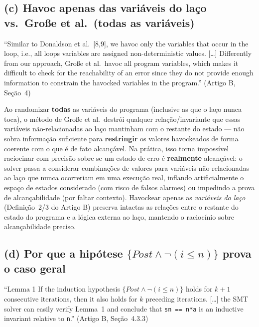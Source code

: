 \documentclass[12pt,a4paper]{article}
\begin{document}
\subsection{(c) Havoc apenas das variáveis do laço vs.\ Große et al.\ (todas as variáveis)}

\begin{tcolorbox}[quotebox]
``Similar to Donaldson et al.\ [8,9], we havoc only the variables that occur in the loop, i.e.,
all loops variables are assigned non-deterministic values. [\ldots] Differently from our
approach, Gro\ss{}e et al.\ havoc all program variables, which makes it difficult to check for
the reachability of an error since they do not provide enough information to constrain the
havocked variables in the program.'' (Artigo B, Se\c{c}\~ao~4)
\end{tcolorbox}

\begin{tcolorbox}[resultbox]
Ao randomizar \textbf{todas} as vari\'aveis do programa (inclusive as que o la\c{c}o nunca
toca), o m\'etodo de Gro\ss{}e et al.\ destr\'oi qualquer rela\c{c}\~ao/invariante que essas
vari\'aveis n\~ao-relacionadas ao la\c{c}o mantinham com o restante do estado --- n\~ao
sobra informa\c{c}\~ao suficiente para \textbf{restringir} os valores havockeados de forma
coerente com o que \'e de fato alcan\c{c}\'avel. Na pr\'atica, isso torna imposs\'ivel
raciocinar com precis\~ao sobre se um estado de erro \'e \textbf{realmente} alcan\c{c}\'avel:
o solver passa a considerar combina\c{c}\~oes de valores para vari\'aveis n\~ao-relacionadas
ao la\c{c}o que nunca ocorreriam em uma execu\c{c}\~ao real, inflando artificialmente o
espa\c{c}o de estados considerado (com risco de falsos alarmes) ou impedindo a prova de
alcan\c{c}abilidade (por faltar contexto). Havockear apenas as \emph{vari\'aveis do la\c{c}o}
(Defini\c{c}\~ao~2/3 do Artigo B) preserva intactas as rela\c{c}\~oes entre o restante do
estado do programa e a l\'ogica externa ao la\c{c}o, mantendo o racioc\'inio sobre
alcan\c{c}abilidade preciso.
\end{tcolorbox}

\subsection{(d) Por que a hipótese $\{Post \wedge \neg(i \le n)\}$ prova o caso geral}

\begin{tcolorbox}[quotebox]
``Lemma 1 If the induction hypothesis $\{Post\wedge\neg(i\le n)\}$ holds for $k+1$ consecutive
iterations, then it also holds for $k$ preceding iterations. [\ldots] the SMT solver can
easily verify Lemma~1 and conclude that \texttt{sn == n*a} is an inductive invariant relative
to \texttt{n}.'' (Artigo B, Se\c{c}\~ao~4.3.3)
\end{tcolorbox}
\end{document}
